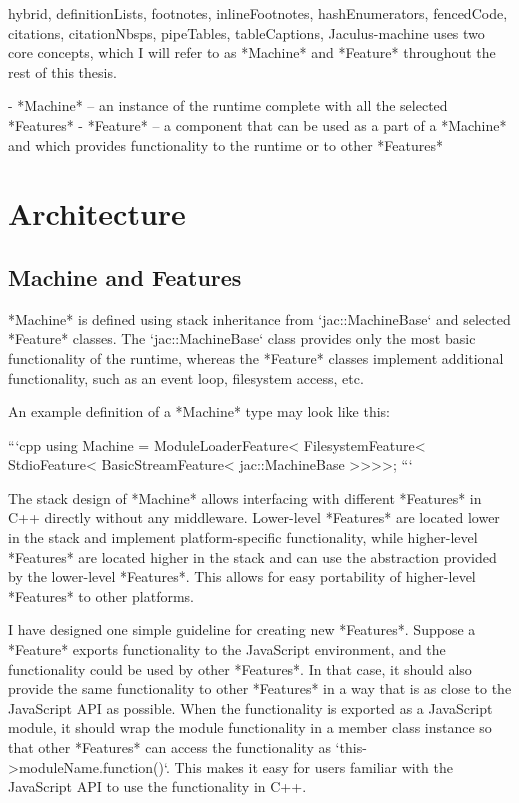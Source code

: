 \documentclass[
  digital,
  oneside,
  nosansbold,
  nocolorbold,
  lof,
  lot
]{fithesis4}
\begin{document}
\begin{markdown*}{%
  hybrid,
  definitionLists,
  footnotes,
  inlineFootnotes,
  hashEnumerators,
  fencedCode,
  citations,
  citationNbsps,
  pipeTables,
  tableCaptions,
}
Jaculus-machine uses two core concepts, which I will refer to as *Machine* and *Feature* throughout the rest of this thesis.

  - *Machine* -- an instance of the runtime complete with all the selected *Features*
  - *Feature* -- a component that can be used as a part of a *Machine* and which provides functionality to the runtime or to other *Features*

\section{Architecture}

\subsection{Machine and Features}

*Machine* is defined using stack inheritance from `jac::MachineBase` and selected *Feature* classes. The `jac::MachineBase` class provides only the most basic functionality of the runtime, whereas the *Feature* classes implement additional functionality, such as an event loop, filesystem access, etc.

An example definition of a *Machine* type may look like this:

```cpp
using Machine =
    ModuleLoaderFeature<
    FilesystemFeature<
    StdioFeature<
    BasicStreamFeature<
    jac::MachineBase
>>>>;
```

The stack design of *Machine* allows interfacing with different *Features* in C++ directly without any middleware. Lower-level *Features* are located lower in the stack and implement platform-specific functionality, while higher-level *Features* are located higher in the stack and can use the abstraction provided by the lower-level *Features*. This allows for easy portability of higher-level *Features* to other platforms.

I have designed one simple guideline for creating new *Features*. Suppose a *Feature* exports functionality to the JavaScript environment, and the functionality could be used by other *Features*. In that case, it should also provide the same functionality to other *Features* in a way that is as close to the JavaScript API as possible. When the functionality is exported as a JavaScript module, it should wrap the module functionality in a member class instance so that other *Features* can access the functionality as `this->moduleName.function()`. This makes it easy for users familiar with the JavaScript API to use the functionality in C++.


\end{markdown*}
\end{document}

